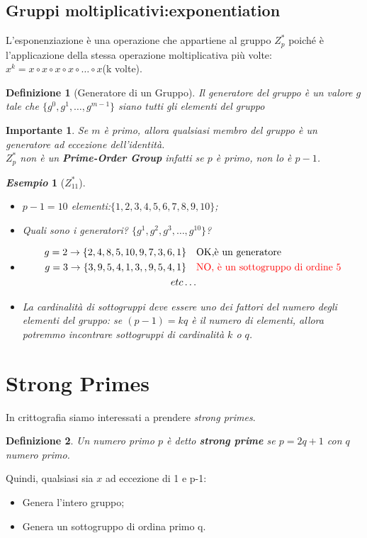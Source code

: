 \documentclass{book}
\newtheorem{Definizione}{\textbf{Definizione}}
\newtheorem*{Importante}{\textbf{Importante}}
\newtheorem{esempio}{\emph{Esempio}}
\begin{document}
\subsection{Gruppi moltiplicativi:exponentiation}
L'esponenziazione è una operazione che appartiene al gruppo \(Z_{p}^{*}\) poiché è l'applicazione della stessa operazione moltiplicativa più volte:\(x^{k}=x\circ x\circ x\circ x\circ \ldots \circ x\)(k volte).
\begin{Definizione}[Generatore di un Gruppo]
    Il generatore del gruppo è un valore \(g\) tale che \( \{g^{0},g^{1},\ldots ,g^{m-1} \} \) siano tutti gli elementi del gruppo
\end{Definizione}
\begin{Importante}
    Se \(m\) è primo, allora qualsiasi membro del gruppo è un generatore ad eccezione dell'identità\@.\\
    \(Z_{p}^{*}\) non è un \textbf{Prime-Order Group} infatti se \(p\) è primo, non lo è \(p-1\).
\end{Importante}
\newpage
\begin{esempio}[\(Z_{11}^{*}\)]
    \begin{itemize}
        \item \(p-1=10\) elementi:\( \{1,2,3,4,5,6,7,8,9,10 \} \);
        \item Quali sono i generatori? \( \{g^{1},g^{2},g^{3},\ldots ,g^{10}\} \)?
        \item \begin{align*}
                  g=2\rightarrow \{2,4,8,5,10,9,7,3,6,1\}\quad & \text{OK,è un generatore}                                \\
                  g=3\rightarrow \{3,9,5,4,1,3,,9,5,4,1\}\quad & \text{\textcolor{red}{NO, è un sottogruppo di ordine 5}} \\
                  etc\ldots
              \end{align*}
        \item La cardinalità di sottogruppi deve essere uno dei fattori del numero degli elementi del gruppo: se \((p-1)=kq\) è il numero di elementi, allora potremmo incontrare sottogruppi di cardinalità \(k\) o \(q\).
    \end{itemize}
\end{esempio}
\section{Strong Primes}
In crittografia siamo interessati a prendere \emph{strong primes}.
\begin{Definizione}
    Un numero primo \(p\) è detto \textbf{strong prime} se \(p=2q+1\) con \(q\) numero primo.
\end{Definizione}
Quindi, qualsiasi sia \(x\) ad eccezione di 1 e p-1:\begin{itemize}
    \item Genera l'intero gruppo;
    \item Genera un sottogruppo di ordina primo q.
\end{itemize}
\end{document}

